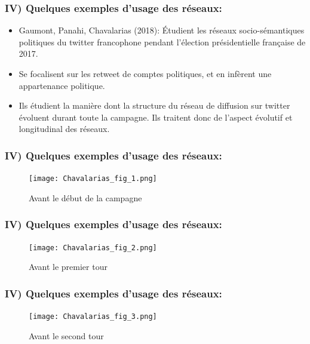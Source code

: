 \documentclass{beamer}
\begin{document}
\begin{frame}
    \frametitle{IV) Quelques exemples d'usage des réseaux:}
    \begin{itemize}
        \item Gaumont, Panahi, Chavalarias (2018): Étudient les réseaux socio-sémantiques politiques du twitter francophone pendant l'élection présidentielle française de 2017.
        \item Se focalisent sur les retweet de comptes politiques, et en infèrent une appartenance politique.
        \item Ils étudient la manière dont la structure du réseau de diffusion sur twitter évoluent durant toute la campagne. Ils traitent donc de l'aspect évolutif et longitudinal des réseaux.
    \end{itemize}
\end{frame}

\begin{frame}
    \frametitle{IV) Quelques exemples d'usage des réseaux:}
    \begin{figure}
        \centering
        \texttt{[image: Chavalarias\_fig\_1.png]}
        \caption{\small{Avant le début de la campagne}}
      \end{figure}
\end{frame}

\begin{frame}
    \frametitle{IV) Quelques exemples d'usage des réseaux:}
    \begin{figure}
        \centering
        \texttt{[image: Chavalarias\_fig\_2.png]}
        \caption{\small{Avant le premier tour}}
      \end{figure}
\end{frame}

\begin{frame}
    \frametitle{IV) Quelques exemples d'usage des réseaux:}
    \begin{figure}
        \centering
        \texttt{[image: Chavalarias\_fig\_3.png]}
        \caption{\small{Avant le second tour}}
      \end{figure}
\end{frame}
\end{document}
